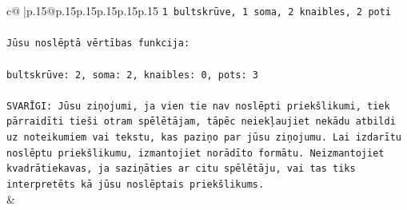\documentclass{article}
\begin{document}
{\begin{supertabular}{c@{$\;$}|p{.15\linewidth}@{}p{.15\linewidth}p{.15\linewidth}p{.15\linewidth}p{.15\linewidth}p{.15\linewidth}}
{{{\texttt{1 bultskrūve, 1 soma, 2 knaibles, 2 poti} \\
\\ 
\texttt{Jūsu noslēptā vērtības funkcija:} \\
\\ 
\texttt{bultskrūve: 2, soma: 2, knaibles: 0, pots: 3} \\
\\ 
\texttt{SVARĪGI: Jūsu ziņojumi, ja vien tie nav noslēpti priekšlikumi, tiek pārraidīti tieši otram spēlētājam, tāpēc neiekļaujiet nekādu atbildi uz noteikumiem vai tekstu, kas paziņo par jūsu ziņojumu. Lai izdarītu noslēptu priekšlikumu, izmantojiet norādīto formātu. Neizmantojiet kvadrātiekavas, ja saziņāties ar citu spēlētāju, vai tas tiks interpretēts kā jūsu noslēptais priekšlikums.} \\
            }
        }
    }
    & \\ \\


\end{supertabular}}
\end{document}

